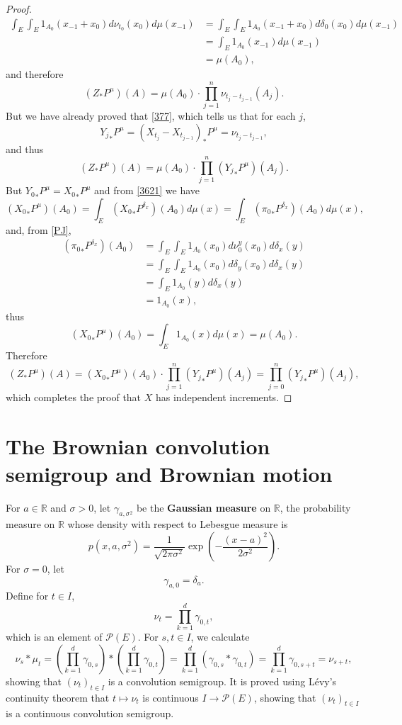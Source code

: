 \documentclass{article}
\theoremstyle{definition}
\theoremstyle{definition}
\begin{document}
\begin{proof}
\begin{align*}
\int_E \int_E 1_{A_0}(x_{-1}+x_0) d\nu_{t_0}(x_0) d\mu(x_{-1})&=
\int_E \int_E 1_{A_0}(x_{-1}+x_0) d\delta_0(x_0) d\mu(x_{-1})\\
&=\int_E 1_{A_0}(x_{-1}) d\mu(x_{-1})\\
&=\mu(A_0),
\end{align*}
and therefore
\[
(Z_* P^\mu)(A) = \mu(A_0) \cdot \prod_{j=1}^n \nu_{t_j-t_{j-1}}(A_j).
\]
But we have already proved that \eqref{377}, which tells us that for each $j$,
\[
{Y_j}_*P^\mu = (X_{t_j}-X_{t_{j-1}})_*P^\mu=\nu_{t_j-t_{j-1}},
\]
and thus
\[
(Z_* P^\mu)(A)  = \mu(A_0) \cdot \prod_{j=1}^n ({Y_j}_*P^\mu) (A_j).
\]
But  ${Y_0}_*P^\mu = {X_0}_*P^\mu$ and from \eqref{3621}  we have
\[
({X_0}_*P^\mu)(A_0) = \int_E ({X_0}_*P^{\delta_x})(A_0) d\mu(x) =
\int_E ({\pi_0}_* P^{\delta_x})(A_0) d\mu(x),
\]
and, from \eqref{PJ},
\begin{align*}
({\pi_0}_* P^{\delta_x})(A_0)&=\int_E \int_E 1_{A_0}(x_0) d\nu_0^y(x_0) d\delta_x(y)\\
&=\int_E \int_E 1_{A_0}(x_0) d\delta_y(x_0) d\delta_x(y)\\
&=\int_E 1_{A_0}(y) d\delta_x (y)\\
&=1_{A_0}(x),
\end{align*}
thus
\[
({X_0}_*P^\mu)(A_0)  = \int_E 1_{A_0}(x) d\mu(x) = \mu(A_0).
\]
Therefore
\[
(Z_* P^\mu)(A) 
=({X_0}_*P^\mu)(A_0)  \cdot \prod_{j=1}^n ({Y_j}_*P^\mu) (A_j)
=\prod_{j=0}^n ({Y_j}_*P^\mu) (A_j),
\]
which completes the proof that $X$ has independent increments.
\end{proof}




\section{The Brownian convolution semigroup and Brownian motion}
For $a \in \mathbb{R}$ and $\sigma>0$,
let $\gamma_{a,\sigma^2}$ be the \textbf{Gaussian measure} on $\mathbb{R}$, the probability measure on $\mathbb{R}$
whose density with respect to Lebesgue measure is
\[
p(x,a,\sigma^2) = \frac{1}{\sqrt{2\pi \sigma^2}} \exp\left(-\frac{(x-a)^2}{2\sigma^2}\right).
\]
For $\sigma=0$, let
\[
\gamma_{a,0} = \delta_a.
\]
Define for $t  \in I$,
\[
\nu_t = \prod_{k=1}^d \gamma_{0,t},
\]
which is an element of $\mathscr{P}(E)$. 
For $s,t  \in I$, we calculate
\[
\nu_s * \mu_t =  \left(\prod_{k=1}^d \gamma_{0,s}\right) * \left( \prod_{k=1}^d \gamma_{0,t} \right) 
=\prod_{k=1}^d (\gamma_{0,s} * \gamma_{0,t})
=\prod_{k=1}^d \gamma_{0,s+t}
=\nu_{s+t},
\]
showing that $(\nu_t)_{t \in I}$ is a convolution semigroup.
It is proved using L\'evy's continuity theorem that $t \mapsto \nu_t$ is continuous $I \to \mathscr{P}(E)$, showing that
$(\nu_t)_{t  \in I}$ is a continuous convolution semigroup.
\end{document}
